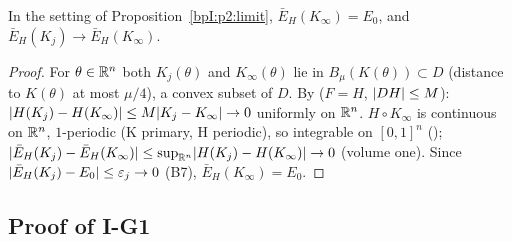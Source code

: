 \begin{lemma}\label{bpI:p2:energy-limit}
In the setting of Proposition~\ref{bpI:p2:limit}, $\bar E_H(K_\infty)=E_0$, and $\bar E_H(K_j)\to\bar E_H(K_\infty)$.
\end{lemma}
\begin{proof}
\label{stepI:p2:el-unif}
For $\theta\in\mathbb{R}^n$ both $K_j(\theta)$ and $K_\infty(\theta)$ lie in $B_\mu(K(\theta))\subset D$ (distance to $K(\theta)$ at most $\mu/4$), a convex subset of $D$. By  ($F=H$, $\lvert DH\rvert\le M$): $\lvert H(K_j)-H(K_\infty)\rvert\le M\lvert K_j-K_\infty\rvert\to0$ uniformly on $\mathbb{R}^n$.
\label{stepI:p2:el-int}
$H\circ K_\infty$ is continuous on $\mathbb{R}^n$, $1$-periodic (K primary, H periodic), so integrable on $[0,1]^n$ (); $\lvert \bar E_H(K_j)-\bar E_H(K_\infty)\rvert\le\sup_{\mathbb{R}^n}\lvert H(K_j)-H(K_\infty)\rvert\to0$ (volume one). Since $\lvert \bar E_H(K_j)-E_0\rvert\le\varepsilon_j\to0$ (B7), $\bar E_H(K_\infty)=E_0$.
\end{proof}

\subsection{Proof of I-G1}\label{bpI:p2:sec-proof}

